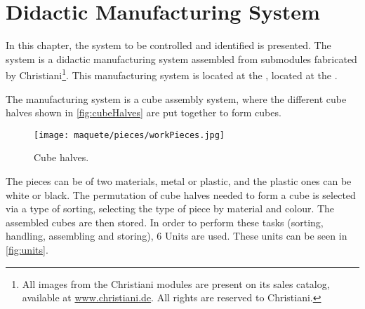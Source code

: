 
\chapter{Didactic Manufacturing System}
\label{cha:system}
In this chapter, the system to be controlled and identified is presented.
The system is a didactic manufacturing system assembled from submodules fabricated
by Christiani\footnote{All images from the Christiani modules are present on its sales
  catalog, available at \url{www.christiani.de}. All rights are reserved to
  Christiani.}. This manufacturing system is located at the \LCA, located at the
\UFRJ.

The manufacturing system is a cube assembly system, where the different cube
halves shown in \autoref{fig:cubeHalves} are put together to form cubes.
\begin{figure}[H]
  \centering
  \texttt{[image: maquete/pieces/workPieces.jpg]}
  \caption{Cube halves.}
  \label{fig:cubeHalves}
\end{figure}

The pieces can be of two materials, metal or plastic, and the plastic ones can
be white or black.
The
permutation of cube halves needed to form a cube is selected via a type of
sorting, selecting the type of piece by material and colour. The assembled cubes
are then stored. In order to perform these tasks (sorting, handling, assembling
and storing), 6 Units are used. These units can be
seen in \autoref{fig:units}.


